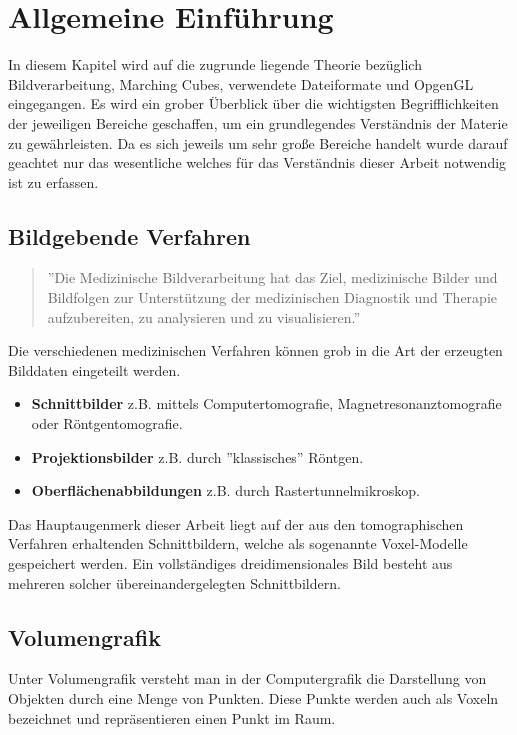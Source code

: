 \chapter{Allgemeine Einführung}
In diesem Kapitel wird auf die zugrunde liegende Theorie bezüglich Bildverarbeitung, Marching Cubes, verwendete Dateiformate und OpgenGL eingegangen. Es wird ein grober Überblick über die wichtigsten Begrifflichkeiten der jeweiligen Bereiche geschaffen, um ein grundlegendes Verständnis der Materie zu gewährleisten. Da es sich jeweils um sehr große Bereiche handelt wurde darauf geachtet nur das wesentliche welches für das Verständnis dieser Arbeit notwendig ist zu erfassen.
\section{Bildgebende Verfahren}
\begin{quote}
	''Die Medizinische Bildverarbeitung hat das Ziel, medizinische Bilder und Bildfolgen zur Unterstützung der medizinischen Diagnostik und Therapie aufzubereiten, zu analysieren und zu visualisieren.'' \citep{MedBildVerarbeitung}\\
\end{quote}
Die verschiedenen medizinischen Verfahren können grob in die Art der erzeugten Bilddaten eingeteilt werden.\\
\begin{itemize}
	\item \textbf{Schnittbilder} z.B. mittels Computertomografie, Magnetresonanztomografie oder Röntgentomografie.
	\item \textbf{Projektionsbilder} z.B. durch ''klassisches'' Röntgen.
	\item \textbf{Oberflächenabbildungen} z.B. durch Rastertunnelmikroskop.\\
\end{itemize}
Das Hauptaugenmerk dieser Arbeit liegt auf der aus den tomographischen Verfahren erhaltenden Schnittbildern, welche als sogenannte Voxel-Modelle gespeichert werden. Ein vollständiges dreidimensionales Bild besteht aus mehreren solcher übereinandergelegten Schnittbildern.

\section{Volumengrafik}
Unter Volumengrafik versteht man in der Computergrafik die Darstellung von Objekten durch eine Menge von Punkten. Diese Punkte werden auch als Voxeln bezeichnet und repräsentieren einen Punkt im Raum.
